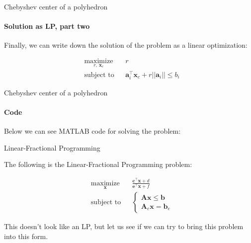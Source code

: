 \documentclass{beamer}
\begin{document}
\begin{frame}{Chebyshev center of a polyhedron}
\framesubtitle{Solution as LP, part two}
\begin{flushleft}

Finally, we can write down the solution of the problem as a linear optimization:

\begin{equation}
\begin{aligned}
& \underset{r, \ \mathbf{x}_c}{\text{maximize}}
& & r \\
& \text{subject to}
& & \mathbf{a}_i^\top \mathbf{x}_c + r ||\mathbf{a}_i||
    \leq b_i
%
\end{aligned}
\end{equation}

 
\end{flushleft}
\end{frame}




\begin{frame}{Chebyshev center of a polyhedron}
\framesubtitle{Code}
\begin{flushleft}

Below we can see MATLAB code for solving the problem:



 
\end{flushleft}
\end{frame}




\begin{frame}{Linear-Fractional Programming}
	\begin{flushleft}
		
		The following is the Linear-Fractional Programming problem:
		
		\begin{equation}
			\begin{aligned}
				& \underset{\mathbf{x}}{\text{maximize}}
				& & \frac{\mathbf{c}^\top \mathbf{x} + d}{\mathbf{e}^\top \mathbf{x} + f} \\
				& \text{subject to}
				& & 
				 \begin{cases}
				 	\mathbf{A} \mathbf{x} \leq \mathbf{b} \\
				 	\mathbf{A}_e \mathbf{x} = \mathbf{b}_e
				 \end{cases}
			\end{aligned}
		\end{equation}
		
		This doesn't look like an LP, but let us see if we can try to bring this problem into this form. 
		
	\end{flushleft}
\end{frame}
\end{document}

